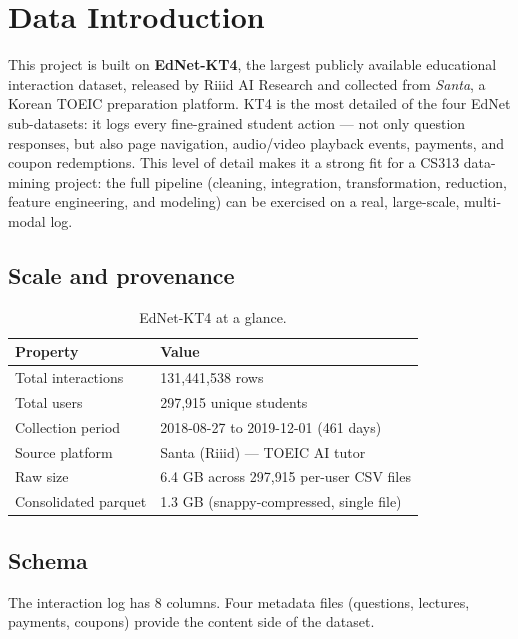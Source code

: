 \section{Data Introduction}

This project is built on \textbf{EdNet-KT4}, the largest publicly available
educational interaction dataset, released by Riiid AI Research and collected
from \emph{Santa}, a Korean TOEIC preparation platform. KT4 is the most
detailed of the four EdNet sub-datasets: it logs every fine-grained student
action — not only question responses, but also page navigation, audio/video
playback events, payments, and coupon redemptions. This level of detail makes
it a strong fit for a CS313 data-mining project: the full pipeline (cleaning,
integration, transformation, reduction, feature engineering, and modeling)
can be exercised on a real, large-scale, multi-modal log.

\subsection{Scale and provenance}

\begin{table}[H]
\centering
\small
\begin{tabular}{ll}
\toprule
Property & Value \\
\midrule
Total interactions   & 131{,}441{,}538 rows \\
Total users          & 297{,}915 unique students \\
Collection period    & 2018-08-27 to 2019-12-01 (461 days) \\
Source platform      & Santa (Riiid) — TOEIC AI tutor \\
Raw size             & 6.4 GB across 297{,}915 per-user CSV files \\
Consolidated parquet & 1.3 GB (snappy-compressed, single file) \\
\bottomrule
\end{tabular}
\caption{EdNet-KT4 at a glance.}
\end{table}

\subsection{Schema}

The interaction log has 8 columns. Four metadata files (questions, lectures,
payments, coupons) provide the content side of the dataset.

